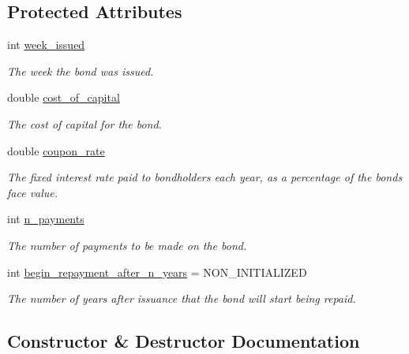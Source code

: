 \subsection*{Protected Attributes}
\begin{DoxyCompactItemize}
\item 
int \mbox{\hyperlink{classBond_a30d48d158cbbd9c7b4bfa0012c89590a}{week\+\_\+issued}}
\begin{DoxyCompactList}\small\item\em The week the bond was issued. \end{DoxyCompactList}\item 
double \mbox{\hyperlink{classBond_ad98df7d28b398e620286f95ee085439b}{cost\+\_\+of\+\_\+capital}}
\begin{DoxyCompactList}\small\item\em The cost of capital for the bond. \end{DoxyCompactList}\item 
double \mbox{\hyperlink{classBond_a5f66785534e24caa43d9f730130a6463}{coupon\+\_\+rate}}
\begin{DoxyCompactList}\small\item\em The fixed interest rate paid to bondholders each year, as a percentage of the bond\textquotesingle{}s face value. \end{DoxyCompactList}\item 
int \mbox{\hyperlink{classBond_a4a227b6de2eeada118d82ab1633b1db8}{n\+\_\+payments}}
\begin{DoxyCompactList}\small\item\em The number of payments to be made on the bond. \end{DoxyCompactList}\item 
int \mbox{\hyperlink{classBond_a8d808753f9708e841dfceca72a110737}{begin\+\_\+repayment\+\_\+after\+\_\+n\+\_\+years}} = N\+O\+N\+\_\+\+I\+N\+I\+T\+I\+A\+L\+I\+Z\+ED
\begin{DoxyCompactList}\small\item\em The number of years after issuance that the bond will start being repaid. \end{DoxyCompactList}\end{DoxyCompactItemize}


\subsection{Constructor \& Destructor Documentation}
\mbox{\label{classBond_ac2ed54d795433c9c6a4236629553fb83}} 
